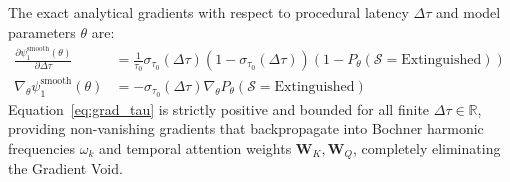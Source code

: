 \documentclass[11pt,a4paper]{article}
\begin{document}
The exact analytical gradients with respect to procedural latency $\Delta \tau$ and model parameters $\theta$ are:
\begin{align}
\frac{\partial \psi_1^{\text{smooth}}(\theta)}{\partial \Delta \tau} &= \frac{1}{\tau_0} \sigma_{\tau_0}(\Delta \tau) \left(1 - \sigma_{\tau_0}(\Delta \tau)\right) \left(1 - P_\theta(\mathcal{S} = \text{Extinguished})\right) \label{eq:grad_tau} \\
\nabla_\theta \psi_1^{\text{smooth}}(\theta) &= - \sigma_{\tau_0}(\Delta \tau) \nabla_\theta P_\theta(\mathcal{S} = \text{Extinguished}) \label{eq:grad_theta}
\end{align}
Equation~\eqref{eq:grad_tau} is strictly positive and bounded for all finite $\Delta \tau \in \mathbb{R}$, providing non-vanishing gradients that backpropagate into Bochner harmonic frequencies $\omega_k$ and temporal attention weights $\mathbf{W}_K, \mathbf{W}_Q$, completely eliminating the Gradient Void.
\end{document}
